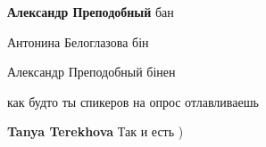 \begin{itemize}

\textbf{Александр Преподобный} бан


Антонина Белоглазова бін


Александр Преподобный бінен


как будто ты спикеров на опрос отлавливаешь


\textbf{Tanya Terekhova} Так и есть )

\end{itemize}
